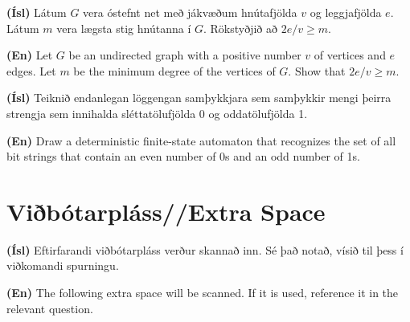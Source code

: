 \documentclass[addpoints]{exam}
\begin{document}
\begin{questions}

\newpage
\question[10] 
\textbf{(Ísl)} Látum $G$ vera óstefnt net með jákvæðum hnútafjölda $v$ og leggjafjölda $e$. Látum $m$ vera lægsta stig hnútanna í $G$. Rökstyðjið að $2e/v \geq m$.


\textbf{(En)} Let $G$ be an undirected graph with a positive number $v$ of vertices and $e$ edges. Let $m$ be the minimum degree of the vertices of $G$. Show that $2e/v \geq m$.



\newpage
\question[10]

\textbf{(Ísl)} Teiknið endanlegan löggengan samþykkjara sem samþykkir mengi þeirra strengja sem innihalda sléttatölufjölda 0 og oddatölufjölda 1.

\textbf{(En)} Draw a deterministic finite-state automaton that recognizes the set of all bit strings that contain an even number of 0s and an odd number of 1s.


\end{questions}

\newpage

\section{Viðbótarpláss//Extra Space}

\textbf{(Ísl)} Eftirfarandi viðbótarpláss verður skannað inn. Sé það notað, vísið til þess í viðkomandi spurningu.

\textbf{(En)} The following extra space will be scanned. If it is used, reference it in the relevant question.


\newpage

\end{document}
